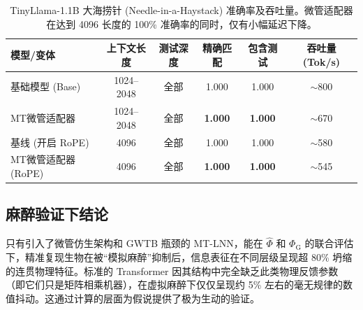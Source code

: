 \documentclass[11pt]{article}
\theoremstyle{definition}
\newcommand{\phihat}{\hat{\Phi}}
\newcommand{\phig}{\Phi_{\mathrm{G}}}
\begin{document}
\begin{table}[h]
\centering
\caption{TinyLlama-1.1B 大海捞针 (Needle-in-a-Haystack) 准确率及吞吐量。微管适配器在达到 4096 长度的 100\% 准确率的同时，仅有小幅延迟下降。}
\label{tab:needle}
\begin{tabular}{lccccc}
\toprule
模型/变体 & 上下文长度 & 测试深度 & 精确匹配 & 包含测试 & 吞吐量 (Tok/s) \\
\midrule
基础模型 (Base) & 1024--2048 & 全部 & 1.000 & 1.000 & $\sim$800 \\
MT微管适配器 & 1024--2048 & 全部 & \textbf{1.000} & \textbf{1.000} & $\sim$670 \\
\midrule
基线 (开启 RoPE) & 4096 & 全部 & 1.000 & 1.000 & $\sim$580 \\
MT微管适配器 (RoPE) & 4096 & 全部 & \textbf{1.000} & \textbf{1.000} & $\sim$545 \\
\bottomrule
\end{tabular}
\end{table}

\subsection{麻醉验证下结论}
只有引入了微管仿生架构和 GWTB 瓶颈的 MT-LNN，能在 $\phihat$ 和 $\phig$ 的联合评估下，精准复现生物在被“模拟麻醉”抑制后，信息表征在不同层级呈现超 80\% 坍缩的连贯物理特征。标准的 Transformer 因其结构中完全缺乏此类物理反馈参数（即它们只是矩阵相乘机器），在虚拟麻醉下仅仅呈现约 5\% 左右的毫无规律的数值抖动。这通过计算的层面为假说提供了极为生动的验证。

\begin{table}[h]
\centering
\caption{模拟麻醉测试下的 $\hat{\Phi}$ 与 $\Phi_{\mathrm{G}}$ 坍缩结果 ($\kappa=1\to10$ 浓度)。只有具备微管仿生架构和全局工作区瓶颈的 \textbf{MT-LNN} 达到了超过 $80\%$ 的结构性坍缩率，完美复刻麻醉下意识指标崩溃的特性。}
\label{tab:anesth}
\end{table}
\end{document}
